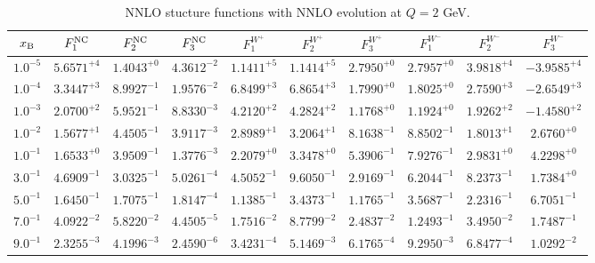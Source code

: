 \begin{table}[h]
\begin{adjustbox}{width=\textwidth}
\begin{tabular}{|c||c|c|c|c|c|c|c|c|c|}
\hline
$x_{\rm B}$ & $F_1^{\rm NC}$ & $F_2^{\rm NC}$ & $F_3^{\rm NC}$ & $F_1^{W^+}$ & $F_2^{W^+}$ & $F_3^{W^+}$ & $F_1^{W^-}$ & $F_2^{W^-}$ & $F_3^{W^-}$ \\
\hline
$ 1.0^{-5}$ & $ 5.6571^{+4}$ & $ 1.4043^{+0}$ & $ 4.3612^{-2}$ & $ 1.1411^{+5}$ & $ 1.1414^{+5}$ & $ 2.7950^{+0}$ & $ 2.7957^{+0}$ & $ 3.9818^{+4}$ & $-3.9585^{+4}$ \\
$ 1.0^{-4}$ & $ 3.3447^{+3}$ & $ 8.9927^{-1}$ & $ 1.9576^{-2}$ & $ 6.8499^{+3}$ & $ 6.8654^{+3}$ & $ 1.7990^{+0}$ & $ 1.8025^{+0}$ & $ 2.7590^{+3}$ & $-2.6549^{+3}$ \\
$ 1.0^{-3}$ & $ 2.0700^{+2}$ & $ 5.9521^{-1}$ & $ 8.8330^{-3}$ & $ 4.2120^{+2}$ & $ 4.2824^{+2}$ & $ 1.1768^{+0}$ & $ 1.1924^{+0}$ & $ 1.9262^{+2}$ & $-1.4580^{+2}$ \\
$ 1.0^{-2}$ & $ 1.5677^{+1}$ & $ 4.4505^{-1}$ & $ 3.9117^{-3}$ & $ 2.8989^{+1}$ & $ 3.2064^{+1}$ & $ 8.1638^{-1}$ & $ 8.8502^{-1}$ & $ 1.8013^{+1}$ & $ 2.6760^{+0}$ \\
$ 1.0^{-1}$ & $ 1.6533^{+0}$ & $ 3.9509^{-1}$ & $ 1.3776^{-3}$ & $ 2.2079^{+0}$ & $ 3.3478^{+0}$ & $ 5.3906^{-1}$ & $ 7.9276^{-1}$ & $ 2.9831^{+0}$ & $ 4.2298^{+0}$ \\
$ 3.0^{-1}$ & $ 4.6909^{-1}$ & $ 3.0325^{-1}$ & $ 5.0261^{-4}$ & $ 4.5052^{-1}$ & $ 9.6050^{-1}$ & $ 2.9169^{-1}$ & $ 6.2044^{-1}$ & $ 8.2373^{-1}$ & $ 1.7384^{+0}$ \\
$ 5.0^{-1}$ & $ 1.6450^{-1}$ & $ 1.7075^{-1}$ & $ 1.8147^{-4}$ & $ 1.1385^{-1}$ & $ 3.4373^{-1}$ & $ 1.1765^{-1}$ & $ 3.5687^{-1}$ & $ 2.2316^{-1}$ & $ 6.7051^{-1}$ \\
$ 7.0^{-1}$ & $ 4.0922^{-2}$ & $ 5.8220^{-2}$ & $ 4.4505^{-5}$ & $ 1.7516^{-2}$ & $ 8.7799^{-2}$ & $ 2.4837^{-2}$ & $ 1.2493^{-1}$ & $ 3.4950^{-2}$ & $ 1.7487^{-1}$ \\
$ 9.0^{-1}$ & $ 2.3255^{-3}$ & $ 4.1996^{-3}$ & $ 2.4590^{-6}$ & $ 3.4231^{-4}$ & $ 5.1469^{-3}$ & $ 6.1765^{-4}$ & $ 9.2950^{-3}$ & $ 6.8477^{-4}$ & $ 1.0292^{-2}$ \\
\hline
\end{tabular}
\end{adjustbox}\caption{NNLO stucture functions with NNLO evolution at $Q = 2$ GeV.}
\label{tab:N2LO-Q2}
\end{table}


